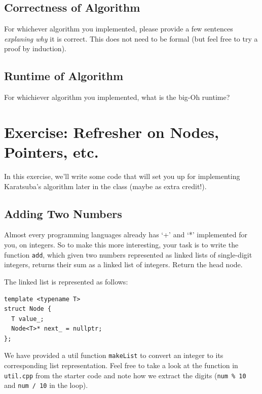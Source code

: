 \documentclass [12pt]{article}
\begin{document}

\subsection{Correctness of Algorithm}
 For whichever algorithm you implemented, please provide a few sentences \textit{explaning why} it is correct. This does not need to be formal (but feel free to try a proof by induction). 


\subsection{Runtime of Algorithm}
 For whichiever algorithm you implemented, what is the big-Oh runtime?



\pagebreak
\section{Exercise: Refresher on Nodes, Pointers, etc.}
 In this exercise, we'll write some code that will set you up for implementing Karatsuba's algorithm later in the class (maybe as extra credit!). 

\subsection{Adding Two Numbers}
Almost every programming languages already has `+' and `*' implemented for you, on integers. So to make this more interesting, your task is to write the function \texttt{add}, which given two numbers represented as linked lists of single-digit
integers, returns their sum as a linked list of integers. Return the head node.

The linked list is represented as follows:
\begin{verbatim}
template <typename T>
struct Node {
  T value_;
  Node<T>* next_ = nullptr;
};
\end{verbatim}

We have provided a util function \texttt{makeList} to convert an integer to its corresponding list representation. Feel free to take a look at the function in \texttt{util.cpp} from the starter code and note how we extract the digits (\texttt{num \% 10} and \texttt{num / 10} in the loop).
\end{document}
